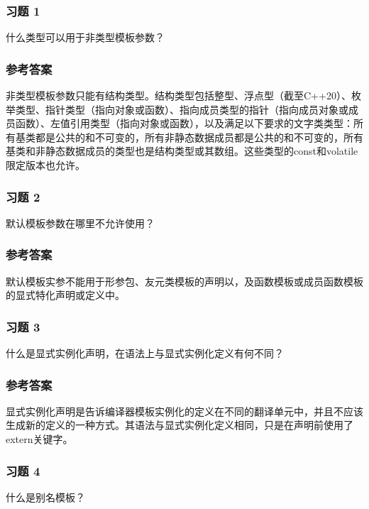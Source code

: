 \subsubsection{习题 1}

什么类型可以用于非类型模板参数？

\subsubsection{参考答案}

非类型模板参数只能有结构类型。结构类型包括整型、浮点型（截至C++20）、枚举类型、指针类型（指向对象或函数）、指向成员类型的指针（指向成员对象或成员函数）、左值引用类型（指向对象或函数），以及满足以下要求的文字类类型：所有基类都是公共的和不可变的，所有非静态数据成员都是公共的和不可变的，所有基类和非静态数据成员的类型也是结构类型或其数组。这些类型的const和volatile限定版本也允许。


\subsubsection{习题 2}

默认模板参数在哪里不允许使用？

\subsubsection{参考答案}

默认模板实参不能用于形参包、友元类模板的声明以，及函数模板或成员函数模板的显式特化声明或定义中。

\subsubsection{习题 3}

什么是显式实例化声明，在语法上与显式实例化定义有何不同？

\subsubsection{参考答案}

显式实例化声明是告诉编译器模板实例化的定义在不同的翻译单元中，并且不应该生成新的定义的一种方式。其语法与显式实例化定义相同，只是在声明前使用了extern关键字。

\subsubsection{习题 4}

什么是别名模板？

